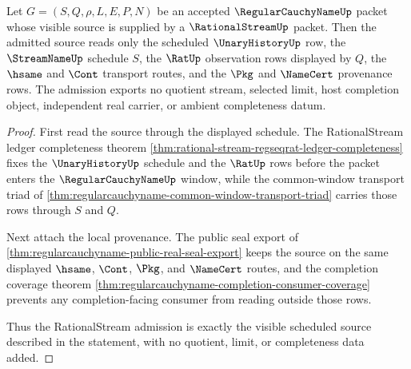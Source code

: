 \begin{theorem}
\label{thm:regularcauchyname-rationalstream-source-admission}
Let $G=(S,Q,\rho,L,E,P,N)$ be an accepted $\RegularCauchyNameUp$ packet whose visible source is supplied by a $\RationalStreamUp$ packet. Then the admitted source reads only the scheduled $\UnaryHistoryUp$ row, the $\StreamNameUp$ schedule $S$, the $\RatUp$ observation rows displayed by $Q$, the $\hsame$ and $\Cont$ transport routes, and the $\Pkg$ and $\NameCert$ provenance rows. The admission exports no quotient stream, selected limit, host completion object, independent real carrier, or ambient completeness datum.
\end{theorem}
\begin{proof}
First read the source through the displayed schedule. The RationalStream ledger completeness theorem \autoref{thm:rational-stream-regseqrat-ledger-completeness} fixes the $\UnaryHistoryUp$ schedule and the $\RatUp$ rows before the packet enters the $\RegularCauchyNameUp$ window, while the common-window transport triad of \autoref{thm:regularcauchyname-common-window-transport-triad} carries those rows through $S$ and $Q$.

Next attach the local provenance. The public seal export of \autoref{thm:regularcauchyname-public-real-seal-export} keeps the source on the same displayed $\hsame$, $\Cont$, $\Pkg$, and $\NameCert$ routes, and the completion coverage theorem \autoref{thm:regularcauchyname-completion-consumer-coverage} prevents any completion-facing consumer from reading outside those rows.

Thus the RationalStream admission is exactly the visible scheduled source described in the statement, with no quotient, limit, or completeness data added.
\end{proof}

